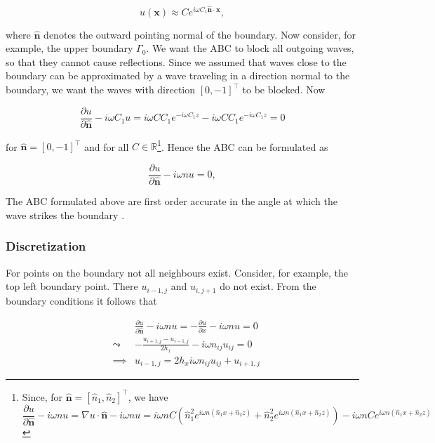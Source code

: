 \documentclass[10pt,a4paper]{article}
\newcommand{\x}{\mathbf{x}}
\newcommand{\n}{\mathbf{n}}
\begin{document}
\begin{equation}
u(\x) \approx Ce^{i\omega C_1 \hat{\n}\cdot \x},
\end{equation}

where $\hat{\n}$ denotes the outward pointing normal of the boundary. Now consider, for example, the upper boundary $\Gamma_0$. We want the ABC to block all outgoing waves, so that they cannot cause reflections. Since we assumed that waves close to the boundary can be approximated by a wave traveling in a direction normal to the boundary, we want the waves with direction $[0,-1]^\top$ to be blocked. Now

\begin{equation}
\frac{\partial u}{\partial \hat{\n}} -i\omega C_1 u = i\omega CC_1e^{-i\omega C_1z} - i\omega CC_1e^{-i \omega C_1 z} = 0
\end{equation}

for $\hat{\n}=[0,-1]^\top$ and for all $C\in\mathbb{R}$\footnote{Since, for $\hat{\n} = [\hat{n}_1,\hat{n}_2]^\top$, we have 
	\begin{equation*}
	\frac{\partial u}{\partial \hat{\n}} -i\omega nu= \nabla u\cdot \hat{\n} -i\omega nu= i\omega nC (\hat{n}_1^2 e^{i\omega n(\hat{n}_1x+\hat{n}_2z)} + \hat{n}_2^2e^{i\omega n(\hat{n}_1x+\hat{n}_2z)})-i\omega nCe^{i\omega n(\hat{n}_1x+\hat{n}_2z)}
	\end{equation*}}. Hence the ABC can be formulated as

\begin{equation}
\frac{\partial u}{\partial \hat{\n}} - i\omega nu=0,
\end{equation}

The ABC formulated above are first order accurate in the angle at which the wave strikes the boundary \cite{AbsorpationRates}.

\subsubsection{Discretization}
For points on the boundary not all neighbours exist. Consider, for example, the top left boundary point. There $u_{i-1,j}$ and $u_{i,j+1}$ do not exist. From the boundary conditions it follows that

\begin{eqnarray}
&& \frac{\partial u}{\partial \hat{\n}} - i\omega nu = -\frac{\partial u}{\partial x} - i\omega nu =0\\
&\leadsto& -\frac{u_{i+1,j}-u_{i-1,j}}{2h_x}-i\omega n_{ij} u_{ij}=0\\
&\implies& u_{i-1,j} = 2h_xi\omega n_{ij}u_{ij}+u_{i+1,j}
\end{eqnarray}
\end{document}
